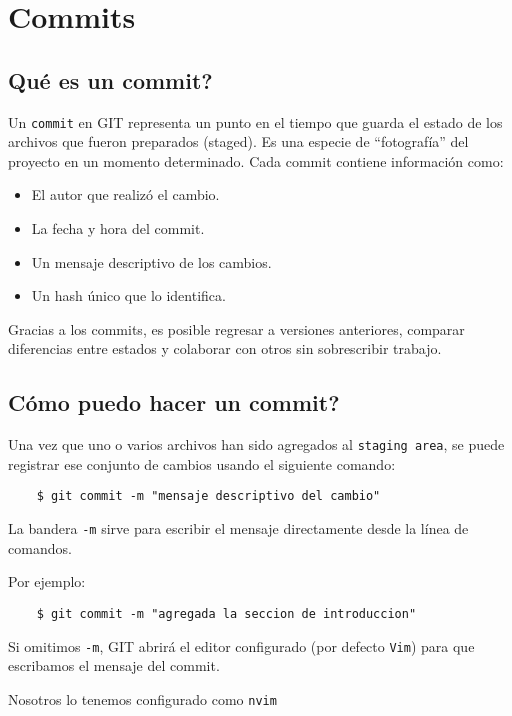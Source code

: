 \section{Commits}

    \subsection{Qu\'e es un commit?}
        Un \texttt{commit} en GIT representa un punto en el tiempo que guarda el estado de los archivos que fueron preparados (staged). Es una especie de ``fotograf\'ia'' del proyecto en un momento determinado. 
        Cada commit contiene informaci\'on como:
        \begin{itemize}
            \item El autor que realiz\'o el cambio.
            \item La fecha y hora del commit.
            \item Un mensaje descriptivo de los cambios.
            \item Un hash \'unico que lo identifica.
        \end{itemize}
        Gracias a los commits, es posible regresar a versiones anteriores, comparar diferencias entre estados y colaborar con otros sin sobrescribir trabajo.

    \subsection{C\'omo puedo hacer un commit?}
        Una vez que uno o varios archivos han sido agregados al \texttt{staging area}, se puede registrar ese conjunto de cambios usando el siguiente comando:
        \begin{lstlisting}
    $ git commit -m "mensaje descriptivo del cambio"
        \end{lstlisting}
        La bandera \texttt{-m} sirve para escribir el mensaje directamente desde la l\'inea de comandos.
        
        Por ejemplo:
        \begin{lstlisting}
    $ git commit -m "agregada la seccion de introduccion"
        \end{lstlisting}

        Si omitimos \texttt{-m}, GIT abrir\'a el editor configurado (por defecto \texttt{Vim}) para que escribamos el mensaje del commit.
    
        Nosotros lo tenemos configurado como \texttt{nvim}

